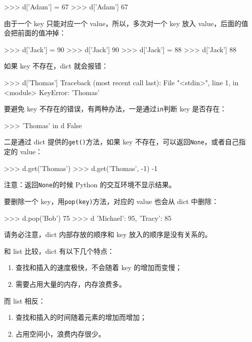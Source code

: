 \begin{pythoncode}
>>> d['Adam'] = 67
>>> d['Adam']
67
\end{pythoncode}

由于一个 key 只能对应一个 value，所以，多次对一个 key 放入
value，后面的值会把前面的值冲掉：

\begin{pythoncode}
>>> d['Jack'] = 90
>>> d['Jack']
90
>>> d['Jack'] = 88
>>> d['Jack']
88
\end{pythoncode}

如果 key 不存在，dict 就会报错：

\begin{pythoncode}
>>> d['Thomas']
Traceback (most recent call last):
  File "<stdin>", line 1, in <module>
KeyError: 'Thomas'
\end{pythoncode}

要避免 key 不存在的错误，有两种办法，一是通过\texttt{in}判断 key
是否存在：

\begin{pythoncode}
>>> 'Thomas' in d
False
\end{pythoncode}

二是通过 dict 提供的\texttt{get()}方法，如果 key
不存在，可以返回\texttt{None}，或者自己指定的 value：

\begin{pythoncode}
>>> d.get('Thomas')
>>> d.get('Thomas', -1)
-1
\end{pythoncode}

注意：返回\texttt{None}的时候 Python 的交互环境不显示结果。

要删除一个 key，用\texttt{pop(key)}方法，对应的 value 也会从 dict
中删除：

\begin{pythoncode}
>>> d.pop('Bob')
75
>>> d
{'Michael': 95, 'Tracy': 85}
\end{pythoncode}

请务必注意，dict 内部存放的顺序和 key 放入的顺序是没有关系的。

和 list 比较，dict 有以下几个特点：

\begin{enumerate}
\def\labelenumi{\arabic{enumi}.}
\item
  查找和插入的速度极快，不会随着 key 的增加而变慢；
\item
  需要占用大量的内存，内存浪费多。
\end{enumerate}

而 list 相反：

\begin{enumerate}
\def\labelenumi{\arabic{enumi}.}
\item
  查找和插入的时间随着元素的增加而增加；
\item
  占用空间小，浪费内存很少。
\end{enumerate}

